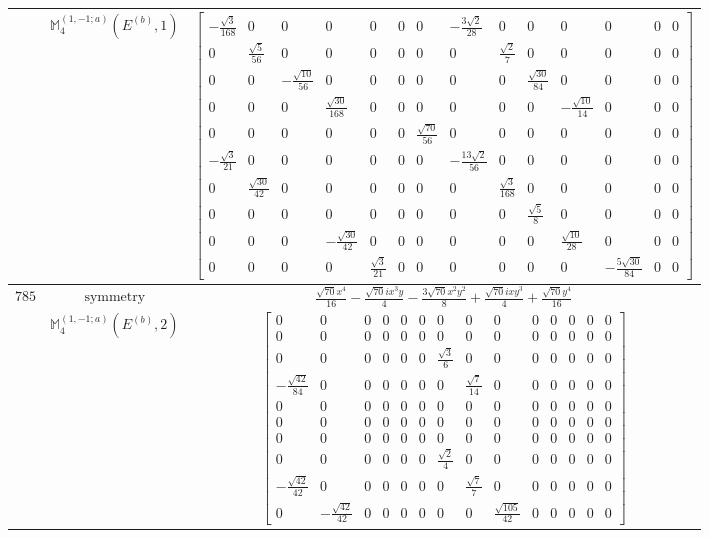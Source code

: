 \documentclass[fleqn,8pt,landscape]{jsarticle}
\begin{document}
\begin{longtable}{ccc}
$  $ & $ \mathbb{M}_{4}^{(1,-1;a)}(E^{(b)},1) $ & $ \begin{bmatrix} - \frac{\sqrt{3}}{168} & 0 & 0 & 0 & 0 & 0 & 0 & - \frac{3 \sqrt{2}}{28} & 0 & 0 & 0 & 0 & 0 & 0 \\ 0 & \frac{\sqrt{5}}{56} & 0 & 0 & 0 & 0 & 0 & 0 & \frac{\sqrt{2}}{7} & 0 & 0 & 0 & 0 & 0 \\ 0 & 0 & - \frac{\sqrt{10}}{56} & 0 & 0 & 0 & 0 & 0 & 0 & \frac{\sqrt{30}}{84} & 0 & 0 & 0 & 0 \\ 0 & 0 & 0 & \frac{\sqrt{30}}{168} & 0 & 0 & 0 & 0 & 0 & 0 & - \frac{\sqrt{10}}{14} & 0 & 0 & 0 \\ 0 & 0 & 0 & 0 & 0 & 0 & \frac{\sqrt{70}}{56} & 0 & 0 & 0 & 0 & 0 & 0 & 0 \\ - \frac{\sqrt{3}}{21} & 0 & 0 & 0 & 0 & 0 & 0 & - \frac{13 \sqrt{2}}{56} & 0 & 0 & 0 & 0 & 0 & 0 \\ 0 & \frac{\sqrt{30}}{42} & 0 & 0 & 0 & 0 & 0 & 0 & \frac{\sqrt{3}}{168} & 0 & 0 & 0 & 0 & 0 \\ 0 & 0 & 0 & 0 & 0 & 0 & 0 & 0 & 0 & \frac{\sqrt{5}}{8} & 0 & 0 & 0 & 0 \\ 0 & 0 & 0 & - \frac{\sqrt{30}}{42} & 0 & 0 & 0 & 0 & 0 & 0 & \frac{\sqrt{10}}{28} & 0 & 0 & 0 \\ 0 & 0 & 0 & 0 & \frac{\sqrt{3}}{21} & 0 & 0 & 0 & 0 & 0 & 0 & - \frac{5 \sqrt{30}}{84} & 0 & 0 \end{bmatrix} $ \\ \hline
$ 785 $ & $ \text{symmetry} $ & $ \frac{\sqrt{70} x^{4}}{16} - \frac{\sqrt{70} i x^{3} y}{4} - \frac{3 \sqrt{70} x^{2} y^{2}}{8} + \frac{\sqrt{70} i x y^{3}}{4} + \frac{\sqrt{70} y^{4}}{16} $ \\
$  $ & $ \mathbb{M}_{4}^{(1,-1;a)}(E^{(b)},2) $ & $ \begin{bmatrix} 0 & 0 & 0 & 0 & 0 & 0 & 0 & 0 & 0 & 0 & 0 & 0 & 0 & 0 \\ 0 & 0 & 0 & 0 & 0 & 0 & 0 & 0 & 0 & 0 & 0 & 0 & 0 & 0 \\ 0 & 0 & 0 & 0 & 0 & 0 & \frac{\sqrt{3}}{6} & 0 & 0 & 0 & 0 & 0 & 0 & 0 \\ - \frac{\sqrt{42}}{84} & 0 & 0 & 0 & 0 & 0 & 0 & \frac{\sqrt{7}}{14} & 0 & 0 & 0 & 0 & 0 & 0 \\ 0 & 0 & 0 & 0 & 0 & 0 & 0 & 0 & 0 & 0 & 0 & 0 & 0 & 0 \\ 0 & 0 & 0 & 0 & 0 & 0 & 0 & 0 & 0 & 0 & 0 & 0 & 0 & 0 \\ 0 & 0 & 0 & 0 & 0 & 0 & 0 & 0 & 0 & 0 & 0 & 0 & 0 & 0 \\ 0 & 0 & 0 & 0 & 0 & 0 & \frac{\sqrt{2}}{4} & 0 & 0 & 0 & 0 & 0 & 0 & 0 \\ - \frac{\sqrt{42}}{42} & 0 & 0 & 0 & 0 & 0 & 0 & \frac{\sqrt{7}}{7} & 0 & 0 & 0 & 0 & 0 & 0 \\ 0 & - \frac{\sqrt{42}}{42} & 0 & 0 & 0 & 0 & 0 & 0 & \frac{\sqrt{105}}{42} & 0 & 0 & 0 & 0 & 0 \end{bmatrix} $ \\ \hline

\end{longtable}
\end{document}
